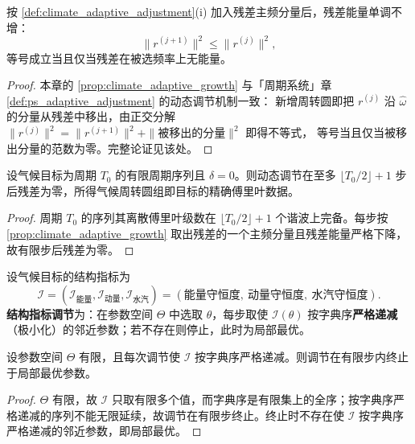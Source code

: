 \begin{proposition}[数量调节的单调性]\label{prop:climate_adaptive_growth}
按 \cref{def:climate_adaptive_adjustment}(i) 加入残差主频分量后，残差能量单调不增：
\[
\|r^{(j+1)}\|^2\le\|r^{(j)}\|^2,
\]
等号成立当且仅当残差在被选频率上无能量。
\end{proposition}

\begin{proof}
本章的 \cref{prop:climate_adaptive_growth} 与「周期系统」章 \cref{def:ps_adaptive_adjustment} 的动态调节机制一致：
新增周转圆即把 $r^{(j)}$ 沿 $\hat\omega$ 的分量从残差中移出，由正交分解
$\|r^{(j)}\|^2=\|r^{(j+1)}\|^2+\|\text{被移出的分量}\|^2$ 即得不等式，
等号当且仅当被移出分量的范数为零。完整论证见该处。
\end{proof}

\begin{theorem}[动态调节的收敛性]\label{thm:climate_adaptive_convergence}
设气候目标为周期 $T_0$ 的有限周期序列且 $\delta=0$。则动态调节在至多 $\lfloor T_0/2\rfloor+1$ 步后残差为零，所得气候周转圆组即目标的精确傅里叶数据。
\end{theorem}

\begin{proof}
周期 $T_0$ 的序列其离散傅里叶级数在 $\lfloor T_0/2\rfloor+1$ 个谐波上完备。每步按 \cref{prop:climate_adaptive_growth} 取出残差的一个主频分量且残差能量严格下降，故有限步后残差为零。
\end{proof}

\begin{definition}[结构指标调节]\label{def:climate_structure_metric_adjustment}
设气候目标的结构指标为
\[
\mathcal I=(\mathcal I_{\text{能量}},\mathcal I_{\text{动量}},\mathcal I_{\text{水汽}})
=(\text{能量守恒度},\ \text{动量守恒度},\ \text{水汽守恒度}).
\]
\textbf{结构指标调节}为：在参数空间 $\Theta$ 中选取 $\theta$，每步取使 $\mathcal I(\theta)$ 按字典序\textbf{严格递减}（极小化）的邻近参数；若不存在则停止，此时为局部最优。
\end{definition}

\begin{proposition}[结构指标调节的有限收敛]\label{prop:climate_structure_metric_convergence}
设参数空间 $\Theta$ 有限，且每次调节使 $\mathcal I$ 按字典序严格递减。则调节在有限步内终止于局部最优参数。
\end{proposition}

\begin{proof}
$\Theta$ 有限，故 $\mathcal I$ 只取有限多个值，而字典序是有限集上的全序；按字典序严格递减的序列不能无限延续，故调节在有限步终止。终止时不存在使 $\mathcal I$ 按字典序严格递减的邻近参数，即局部最优。
\end{proof}


